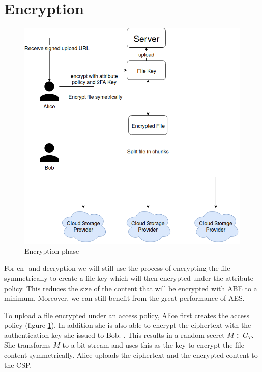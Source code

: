 \section{Encryption}
\begin{figure}[!t]
\centering
    \includegraphics[width=0.7\linewidth]{img/TF-DAC-MACS-overview-encrypt.png}
    \caption{Encryption phase}
    \label{fig:tfdacmacs-encrypt}
\end{figure}

For en- and decryption we will still use the process of encrypting the file symmetrically to create a file key which will then encrypted under the attribute policy. This reduces the size of the content that will be encrypted with ABE to a minimum. Moreover, we can still benefit from the great performance of \ac{AES}. 

To upload a file encrypted under an access policy, Alice first creates the access policy (figure \ref{fig:tfdacmacs-encrypt}). In addition she is also able to encrypt the ciphertext with the authentication key she issued to Bob. . This results in a random secret $M \in G_T$. She transforms $M$ to a bit-stream and uses this as the key to encrypt the file content symmetrically. Alice uploads the ciphertext and the encrypted content to the CSP. 

